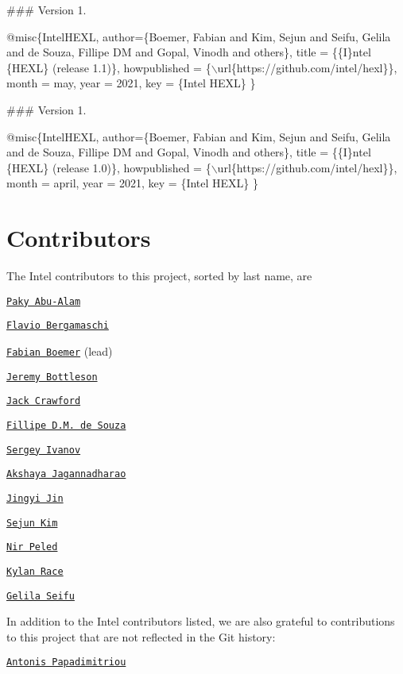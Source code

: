 \#\#\# Version 1. 
\begin{DoxyCode}
@misc\{IntelHEXL,
    author=\{Boemer, Fabian and Kim, Sejun and Seifu, Gelila and de Souza, Fillipe DM and Gopal, Vinodh and
       others\},
    title = \{\{I\}ntel \{HEXL\} (release 1.1)\},
    howpublished = \{\(\backslash\)url\{https://github.com/intel/hexl\}\},
    month = may,
    year = 2021,
    key = \{Intel HEXL\}
\}
\end{DoxyCode}


\#\#\# Version 1. 
\begin{DoxyCode}
@misc\{IntelHEXL,
    author=\{Boemer, Fabian and Kim, Sejun and Seifu, Gelila and de Souza, Fillipe DM and Gopal, Vinodh and
       others\},
    title = \{\{I\}ntel \{HEXL\} (release 1.0)\},
    howpublished = \{\(\backslash\)url\{https://github.com/intel/hexl\}\},
    month = april,
    year = 2021,
    key = \{Intel HEXL\}
\}
\end{DoxyCode}


\section*{Contributors}

The Intel contributors to this project, sorted by last name, are
\begin{DoxyItemize}
\item \href{https://www.linkedin.com/in/paky-abu-alam-89797710/}{\tt Paky Abu-\/\+Alam}
\item \href{https://www.linkedin.com/in/flavio-bergamaschi-1634141/}{\tt Flavio Bergamaschi}
\item \href{https://www.linkedin.com/in/fabian-boemer-5a40a9102/}{\tt Fabian Boemer} (lead)
\item \href{https://www.linkedin.com/in/jeremy-bottleson-38852a7/}{\tt Jeremy Bottleson}
\item \href{https://www.linkedin.com/in/jacklhcrawford/}{\tt Jack Crawford}
\item \href{https://www.linkedin.com/in/fillipe-d-m-de-souza-a8281820/}{\tt Fillipe D.\+M. de Souza}
\item \href{https://www.linkedin.com/in/sergey-ivanov-451b72195/}{\tt Sergey Ivanov}
\item \href{https://www.linkedin.com/in/akshaya-jagannadharao/}{\tt Akshaya Jagannadharao}
\item \href{https://www.linkedin.com/in/jingyi-jin-655735/}{\tt Jingyi Jin}
\item \href{https://www.linkedin.com/in/sejun-kim-2b1b4866/}{\tt Sejun Kim}
\item \href{https://www.linkedin.com/in/nir-peled-4a52266/}{\tt Nir Peled}
\item \href{https://www.linkedin.com/in/kylanrace/}{\tt Kylan Race}
\item \href{https://www.linkedin.com/in/gelila-seifu/}{\tt Gelila Seifu}
\end{DoxyItemize}

In addition to the Intel contributors listed, we are also grateful to contributions to this project that are not reflected in the Git history\+:
\begin{DoxyItemize}
\item \href{https://www.linkedin.com/in/apapadimitriou/}{\tt Antonis Papadimitriou} 
\end{DoxyItemize}
